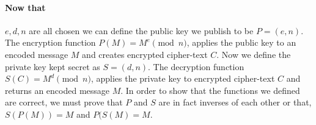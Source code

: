 \documentclass[12pt]{article}
\begin{document}
\paragraph{Now that} $e,d,n$ are all chosen we can define the public key we publish to be $P=(e,n)$.  The encryption function $P(M)= M^e \pmod{n}$, applies the public key to an encoded message $M$ and creates encrypted cipher-text $C$.  Now we define the private key kept secret as $S=(d,n)$.  The decryption function $S(C) = M^d \pmod{n}$, applies the private key to encrypted cipher-text $C$ and returns an encoded message $M$.  In order to show that the functions we defined are correct, we must prove that $P$ and $S$ are in fact inverses of each other or that, $S(P(M)) = M$ and $P(S(M) = M$. 
\end{document}

